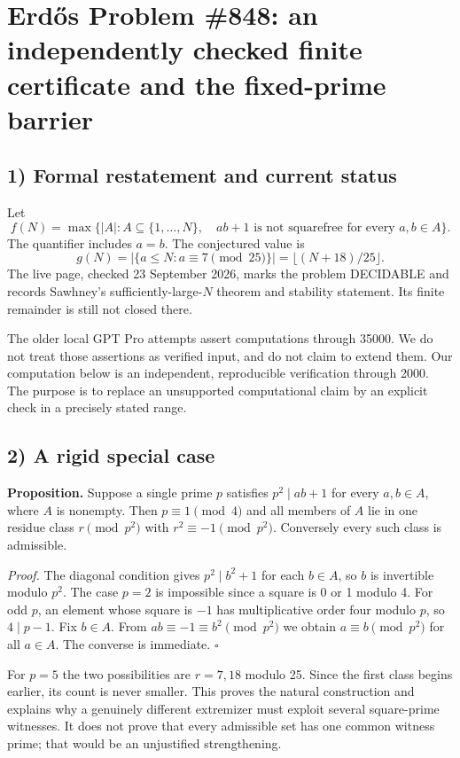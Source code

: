\section{Erd\H{o}s Problem \#848: an independently checked finite certificate and the fixed-prime barrier}

\subsection*{1) Formal restatement and current status}
Let
\[
f(N)=\max\{|A|:A\subseteq\{1,\ldots,N\},\quad ab+1\text{ is not squarefree for every }a,b\in A\}.
\]
The quantifier includes $a=b$. The conjectured value is
\[
g(N)=|\{a\leq N:a\equiv7\pmod{25}\}|=\lfloor(N+18)/25\rfloor.
\]
The live page, checked 23 September 2026, marks the problem DECIDABLE and records Sawhney's sufficiently-large-$N$ theorem and stability statement. Its finite remainder is still not closed there.

The older local GPT Pro attempts assert computations through 35000. We do not treat those assertions as verified input, and do not claim to extend them. Our computation below is an independent, reproducible verification through 2000. The purpose is to replace an unsupported computational claim by an explicit check in a precisely stated range.

\subsection*{2) A rigid special case}
\textbf{Proposition.} Suppose a single prime $p$ satisfies $p^2\mid ab+1$ for every $a,b\in A$, where $A$ is nonempty. Then $p\equiv1\pmod4$ and all members of $A$ lie in one residue class $r\pmod{p^2}$ with $r^2\equiv-1\pmod{p^2}$. Conversely every such class is admissible.

\emph{Proof.} The diagonal condition gives $p^2\mid b^2+1$ for each $b\in A$, so $b$ is invertible modulo $p^2$. The case $p=2$ is impossible since a square is 0 or 1 modulo 4. For odd $p$, an element whose square is $-1$ has multiplicative order four modulo $p$, so $4\mid p-1$. Fix $b\in A$. From $ab\equiv-1\equiv b^2\pmod{p^2}$ we obtain $a\equiv b\pmod{p^2}$ for all $a\in A$. The converse is immediate. $\square$

For $p=5$ the two possibilities are $r=7,18$ modulo 25. Since the first class begins earlier, its count is never smaller. This proves the natural construction and explains why a genuinely different extremizer must exploit several square-prime witnesses. It does not prove that every admissible set has one common witness prime; that would be an unjustified strengthening.

